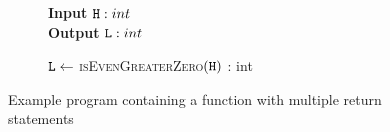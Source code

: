 \begin{figure}
\centering
    \begin{subfigure}{.7\textwidth}
        \centering
    \begin{algorithm}[H]
        \hspace*{\algorithmicindent} \textbf{Input} $\mathtt{H}: int$ \\
        \hspace*{\algorithmicindent} \textbf{Output} $\mathtt{L}: int$\\
        \begin{algorithmic}[1]
            \State $\mathtt{L} \leftarrow $ \textsc{isEvenGreaterZero}$(\mathtt{H})$
            \vspace{1em}
            : int
                \State {} 
                \Else
                \State {}
                \Else
                \State {}
                \EndIf
            \EndIf
            \EndProcedure
        \end{algorithmic} 
    \end{algorithm}
    \end{subfigure}
    \caption{Example program containing a function with multiple return statements}\label{fig:mmult}
\end{figure}

